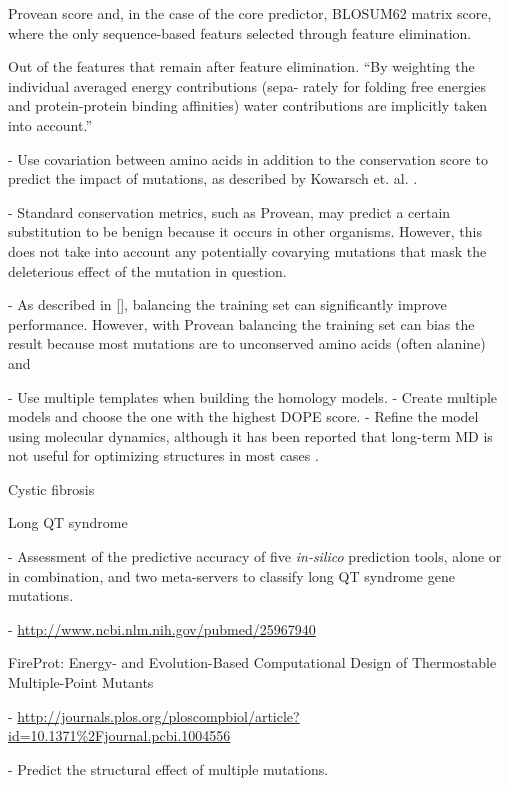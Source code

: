 Provean score and, in the case of the core predictor, BLOSUM62 matrix score, where the only sequence-based featurs selected through feature elimination.

Out of the features that remain after feature elimination.
``By weighting the individual averaged energy contributions (sepa-
rately for folding free energies and protein-protein binding affinities)
water contributions are implicitly taken into account.''


- Use covariation between amino acids in addition to the conservation score to predict the impact of mutations, as described by Kowarsch et. al. \cite{kowarsch_correlated_2010}.

- Standard conservation metrics, such as Provean, may predict a certain substitution to be benign because it occurs in other organisms. However, this does not take into account any potentially covarying mutations that mask the deleterious effect of the mutation in question.

- As described in [], balancing the training set can significantly improve performance. However, with Provean balancing the training set can bias the result because most mutations are to unconserved amino acids (often alanine) and



- Use multiple templates when building the homology models.
- Create multiple models and choose the one with the highest DOPE score.
- Refine the model using molecular dynamics, although it has been reported that long-term MD is not useful for optimizing structures in most cases \cite{raval_refinement_2012}.


Cystic fibrosis



Long QT syndrome

  - Assessment of the predictive accuracy of five \textit{in-silico} prediction tools, alone or in combination, and two meta-servers to classify long QT syndrome gene mutations.

  - \url{http://www.ncbi.nlm.nih.gov/pubmed/25967940}



FireProt: Energy- and Evolution-Based Computational Design of Thermostable Multiple-Point Mutants

  - \url{http://journals.plos.org/ploscompbiol/article?id=10.1371%2Fjournal.pcbi.1004556}

  - Predict the structural effect of multiple mutations.

